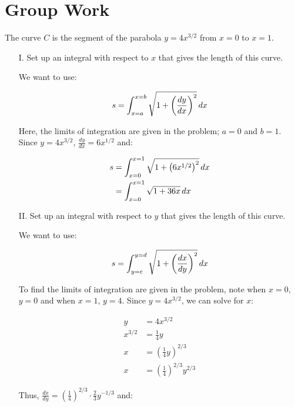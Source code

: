\documentclass[]{ximera}
\begin{document}

\section{Group Work}

\begin{problem}
The curve $C$ is the segment of the parabola $y=4x^{3/2}$ from $x=0$ to $x=1$. 
\begin{enumerate}
\item[I.] Set up an integral with respect to $x$ that gives the length of this curve.

\begin{freeResponse}
We want to use:

\[
s = \int_{x=a}^{x=b} \sqrt{1+\left(\frac{dy}{dx}\right)^2} \mathop{}\!d x
\]

Here, the limits of integration are given in the problem; $a=0$ and $b=1$.  Since $y=4x^{3/2}$, $\frac{dy}{dx} = 6x^{1/2}$ and:

\begin{align*}
s &=  \int_{x=0}^{x=1} \sqrt{1+\left(6x^{1/2}\right)^2} \mathop{}\!d x \\
&=  \int_{x=0}^{x=1} \sqrt{1+36x} \mathop{}\!d x \\
\end{align*}
\end{freeResponse}

\item[II.] Set up an integral with respect to $y$ that gives the length of this curve.

\begin{freeResponse}
We want to use:

\[
s = \int_{y=c}^{y=d} \sqrt{1+\left(\frac{dx}{dy}\right)^2} \mathop{}\!d x
\]

To find the limits of integration are given in the problem, note when $x=0$, $y=0$ and when $x=1$, $y=4$.  Since $y=4x^{3/2}$, we can solve for $x$:

\begin{align*}
y&=4x^{3/2} \\
x^{3/2} &= \frac{1}{4} y  \\
x &= \left(\frac{1}{4}y\right)^{2/3} \\
x& = \left(\frac{1}{4}\right)^{2/3} y^{2/3}
\end{align*}

Thus, $\frac{dx}{dy} = \left(\frac{1}{4}\right)^{2/3} \cdot \frac{2}{3} y^{-1/3}$  and:


\end{freeResponse}
\end{enumerate}
\end{problem}
\end{document}
